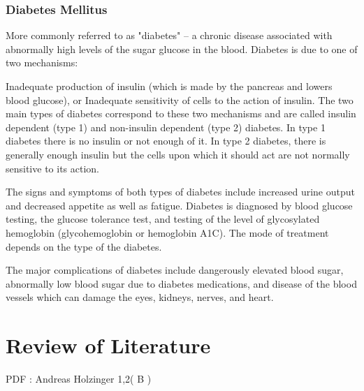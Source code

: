 \documentclass[12pt]{article}
\begin{document}
\iffalse 

https://www.courant.com/news/connecticut/hc-xpm-2001-09-18-0109180410-story.html 
PIMA INDIANS: A CASE STUDY
GREG MORAGO; Courant Staff Writer
THE HARTFORD COURANT

\fi


\newpage
\iffalse
\section{Identifying Groups prone to Diabetes}
https://www.ncbi.nlm.nih.gov/pmc/articles/PMC4418458/ \fi

\newpage
\section{Diabetes Mellitus}
More commonly referred to as "diabetes" -- a chronic disease associated with abnormally high levels of the sugar glucose in the blood. Diabetes is due to one of two mechanisms:

Inadequate production of insulin (which is made by the pancreas and lowers blood glucose), or
Inadequate sensitivity of cells to the action of insulin.
The two main types of diabetes correspond to these two mechanisms and are called insulin dependent (type 1) and non-insulin dependent (type 2) diabetes. In type 1 diabetes there is no insulin or not enough of it. In type 2 diabetes, there is generally enough insulin but the cells upon which it should act are not normally sensitive to its action.

The signs and symptoms of both types of diabetes include increased urine output and decreased appetite as well as fatigue. Diabetes is diagnosed by blood glucose testing, the glucose tolerance test, and testing of the level of glycosylated hemoglobin (glycohemoglobin or hemoglobin A1C). The mode of treatment depends on the type of the diabetes.

The major complications of diabetes include dangerously elevated blood sugar, abnormally low blood sugar due to diabetes medications, and disease of the blood vessels which can damage the eyes, kidneys, nerves, and heart.

\newpage
\part{Review of Literature}
\iffalse
Source : https://www.ncbi.nlm.nih.gov/pmc/articles/PMC5851210/
\fi

\iffalse
PDF :
Andreas Holzinger 1,2( B )
\end{document}
